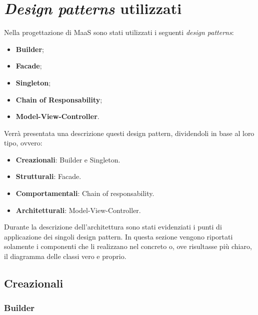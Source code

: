 \newpage
\section{\textit{Design patterns} utilizzati}
Nella progettazione di MaaS sono stati utilizzati i seguenti \textit{design patterns}:
\begin{itemize}
\item \textbf{Builder};
\item \textbf{Facade};
\item \textbf{Singleton};
\item \textbf{Chain of Responsability};
\item \textbf{Model-View-Controller}.
\end{itemize}
Verrà presentata una descrizione questi design pattern, dividendoli in base al loro tipo, ovvero:
\begin{itemize}
\item \textbf{Creazionali}: Builder e Singleton.
\item \textbf{Strutturali}: Facade.
\item \textbf{Comportamentali}: Chain of responsability.
\item \textbf{Architetturali}: Model-View-Controller.
\end{itemize}
Durante la descrizione dell'architettura sono stati evidenziati i punti di applicazione dei singoli design pattern. In questa sezione vengono riportati solamente i componenti che li realizzano nel concreto o, ove risultasse più chiaro, il diagramma delle classi vero e proprio.
\subsection{Creazionali}
\subsubsection{Builder}
